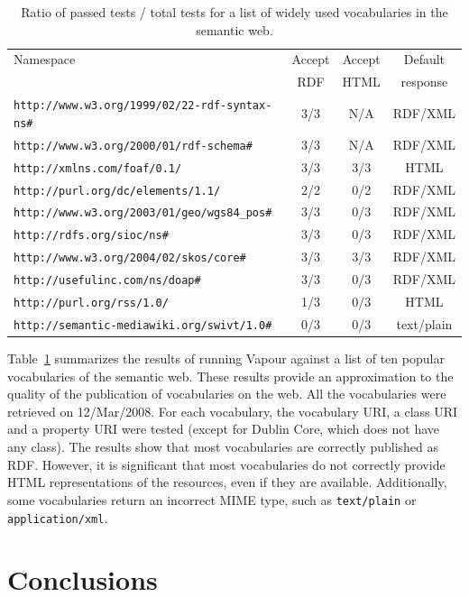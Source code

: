 \documentclass{../templates/llncs}
\begin{document}
\begin{table}[t]
\caption{Ratio of passed tests / total tests for a list of widely used vocabularies in the semantic web.}
\centering
\begin{tabular}{lccc}
\hline
Namespace & Accept & Accept & Default \\
 & RDF & HTML & response \\
\hline\hline
\texttt{http://www.w3.org/1999/02/22-rdf-syntax-ns\#} & 3/3 & N/A & RDF/XML \\
\texttt{http://www.w3.org/2000/01/rdf-schema\#} & 3/3 & N/A & RDF/XML \\
\texttt{http://xmlns.com/foaf/0.1/} & 3/3 & 3/3 & HTML \\
\texttt{http://purl.org/dc/elements/1.1/} & 2/2 & 0/2 & RDF/XML \\
\texttt{http://www.w3.org/2003/01/geo/wgs84\_pos\#} & 3/3 & 0/3 & RDF/XML \\
\texttt{http://rdfs.org/sioc/ns\#} & 3/3 & 0/3 & RDF/XML \\
\texttt{http://www.w3.org/2004/02/skos/core\#} & 3/3 & 3/3 & RDF/XML \\
\texttt{http://usefulinc.com/ns/doap\#} & 3/3 & 0/3 & RDF/XML \\
\texttt{http://purl.org/rss/1.0/} & 1/3 & 0/3 & HTML \\
\texttt{http://semantic-mediawiki.org/swivt/1.0\#} & 0/3 & 0/3 & text/plain \\ [1ex]
\hline
\end{tabular}
\label{tab:usage}
\end{table}

Table~\ref{tab:usage} summarizes the results of running Vapour against a list of
ten popular vocabularies of the semantic web. These results provide an
approximation to the quality of the publication of vocabularies on the web. 
All the vocabularies were retrieved on 12/Mar/2008. For each vocabulary, the vocabulary URI, a class URI and a property URI were tested
(except for Dublin Core, which does not have any class). The results show that
most vocabularies are correctly published as RDF. However, it is significant that
most vocabularies do not correctly provide HTML representations of the resources, even
if they are available.
Additionally, some vocabularies return an incorrect MIME type,
such as \texttt{text/plain} or \texttt{application/xml}.

\section{\label{sec:conclusions}Conclusions}
\end{document}

